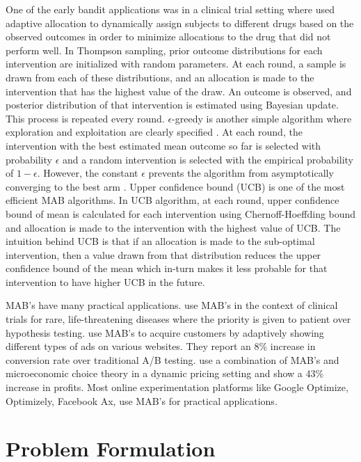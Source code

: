 \documentclass[12pt, letterpaper]{article}
\begin{document}
One of the early bandit applications was in a clinical trial setting where \cite{thompson1933likelihood} used adaptive allocation to dynamically assign subjects to different drugs based on the observed outcomes in order to minimize allocations to the drug that did not perform well. In Thompson sampling, prior outcome distributions for each intervention are initialized with random parameters. At each round, a sample is drawn from each of these distributions, and an allocation is made to the intervention that has the highest value of the draw. An outcome is observed, and posterior distribution of that intervention is estimated using Bayesian update. This process is repeated every round. $\epsilon$-greedy is another simple algorithm where exploration and exploitation are clearly specified \citep{kuleshov2014algorithms}. At each round, the intervention with the best estimated mean outcome so far is selected with probability $\epsilon$ and a random intervention is selected with the empirical probability of $1-\epsilon$. However, the constant $\epsilon$ prevents the algorithm from asymptotically converging to the best arm \citep{vermorel2005multi}. Upper confidence bound (UCB) is one of the most efficient MAB algorithms.  In UCB algorithm, at each round, upper confidence bound of mean is calculated for each intervention using Chernoff-Hoeffding bound \citep{chernoff1952measure} and allocation is made to the intervention with the highest value of UCB. The intuition behind UCB is that if an allocation is made to the sub-optimal intervention, then a value drawn from that distribution reduces the upper confidence bound of the mean which in-turn makes it less probable for that intervention to have higher UCB in the future. 

MAB's have many practical applications. \cite{villar2018bandit} use MAB's in the context of clinical trials for rare, life-threatening diseases where the priority is given to patient over hypothesis testing. \cite{schwartz2017customer} use MAB's to acquire customers by adaptively showing different types of ads on various websites. They report an 8\% increase in conversion rate over traditional A/B testing. \cite{misra2019dynamic} use a combination of MAB's and microeconomic choice theory in a dynamic pricing setting and show a 43\% increase in profits. Most online experimentation platforms like Google Optimize, Optimizely, Facebook Ax, use MAB's for practical applications.


\section*{Problem Formulation}
\end{document}
